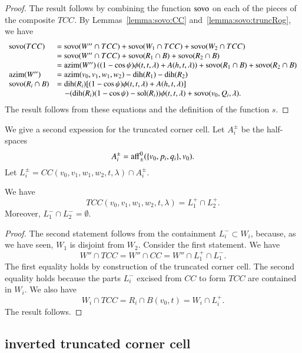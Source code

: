 \begin{proof}  The result follows by combining the function
${\operatorname{sovo}}$ on each of the pieces of the composite $TCC$.
By Lemmas~\ref{lemma:sovo:CC} and~\ref{lemma:sovo:truncRog},  
we have
$$
\begin{array}{lll}
  {\operatorname{sovo}}(TCC) &= {\operatorname{sovo}}(W''\cap TCC) + {\operatorname{sovo}}(W_1\cap TCC)
  + {\operatorname{sovo}}(W_2\cap TCC)\\
  &={\operatorname{sovo}}(W''\cap TCC) + {\operatorname{sovo}}(R_1\cap B)
  + {\operatorname{sovo}}(R_2\cap B)\\
  &= {\operatorname{azim}}(W'') \left((1-\cos\psi)\phi(t,t,\lambda)+
    A(h,t,\lambda)\right) 
   + {\operatorname{sovo}}(R_1\cap B)
  + {\operatorname{sovo}}(R_2\cap B)\\
  {\operatorname{azim}}(W'') &= {\operatorname{azim}}(v_0,v_1,w_1,w_2)-\operatorname{dih}(R_1)-\operatorname{dih}(R_2)\\
  {\operatorname{sovo}}(R_i\cap B) &= \operatorname{dih}(R_i) [(1-\cos\psi)\phi(t,t,\lambda)+A(h,t,\lambda)]\\
   &\quad -(\operatorname{dih}(R_i) (1-\cos\psi) - \operatorname{sol}(R_i)) \phi(t,t,\lambda) + 
   {\operatorname{sovo}}(v_0,Q_i,\lambda).
\end{array}
$$
The result follows from these equations and the definition of
the function $s$.
\end{proof}



We give a second expession for the truncated corner cell.
Let $A_i^\pm$ be the half-spaces
$$
  A_i^\pm = {\operatorname{aff}}_\pm^0(\{v_0,p_i,q_i\},v_0).
$$
Let $L_i^\pm = CC(v_0,v_1,w_1,w_2,t,\lambda)\cap A_i^\pm$.

\begin{lemma}\label{lemma:LL}
We have
  $$
  TCC(v_0,v_1,w_1,w_2,t,\lambda) = L_1^+\cap L_2^+.
  $$
Moreover, 
$L_1^-\cap L_2^- =\emptyset$.
\end{lemma}

\begin{proof}
The second statement follows from the containment
   $L_i^- \subset W_i$, because, as we have seen,
$W_1$ is disjoint
from $W_2$.
Consider the first statement.  
We have
 $$
 W'' \cap TCC = W'' \cap CC = W'' \cap L_1^+ \cap L_1^-.
 $$
The first equality holds by construction of the truncated corner
cell.  The second equality holds because the parts $L_i^-$ excised
from $CC$ to form $TCC$ are contained in $W_i$.
We also have
  $$
  W_i \cap TCC = R_i \cap B(v_0,t) = W_i  \cap L_i^+.
  $$
The result follows.
\end{proof}




\subsection{inverted truncated corner cell}


